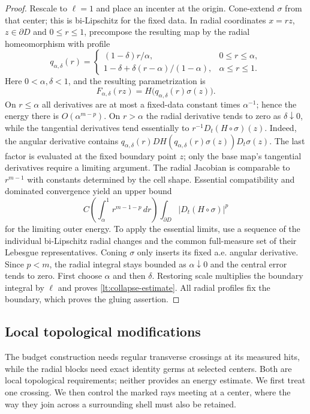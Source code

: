\begin{proof}
Rescale to $\ell=1$ and place an incenter at the origin. Cone-extend
$\sigma$ from that center; this is bi-Lipschitz for the fixed data.
In radial coordinates
$x=rz$, $z\in\partial D$ and $0\leq r\leq1$, precompose the
resulting map by the radial homeomorphism with profile
\[
 q_{\alpha,\delta}(r)=
 \begin{cases}
 (1-\delta)r/\alpha,&0\leq r\leq\alpha,\\
 1-\delta+\delta(r-\alpha)/(1-\alpha),&\alpha\leq r\leq1.
 \end{cases}
\]
Here $0<\alpha,\delta<1$, and the resulting parametrization is
\[
 F_{\alpha,\delta}(rz)
       =H\bigl(q_{\alpha,\delta}(r)\sigma(z)\bigr).
\]
On $r\leq\alpha$ all derivatives are
at most a fixed-data constant times $\alpha^{-1}$; hence the energy
there is $O(\alpha^{m-p})$.  On $r>\alpha$ the radial derivative
tends to zero as $\delta\downarrow0$, while the tangential derivatives
tend essentially to $r^{-1}D_t(H\circ\sigma)(z)$. Indeed, the
angular derivative contains
$q_{\alpha,\delta}(r)DH(q_{\alpha,\delta}(r)\sigma(z))D_t\sigma(z)$.
The last factor is evaluated at the fixed boundary point $z$;
only the base map's tangential derivatives require a limiting
argument. The radial
Jacobian is comparable to $r^{m-1}$ with constants determined by the
cell shape.  Essential compatibility and dominated convergence yield
an upper bound
\[
 C\left(\int_\alpha^1r^{m-1-p}\,dr\right)
                      \int_{\partial D}|D_t(H\circ\sigma)|^p
\]
for the limiting outer energy.  To apply the essential limits, use a
sequence of the individual bi-Lipschitz radial changes and the common
full-measure set of their Lebesgue representatives.  Coning $\sigma$
only inserts its fixed a.e. angular derivative.  Since $p<m$, the
radial integral stays bounded as $\alpha\downarrow0$ and the central
error tends to zero.  First choose $\alpha$ and then $\delta$.
Restoring scale multiplies the boundary integral by $\ell$ and proves
\eqref{lt:collapse-estimate}.  All radial profiles fix the boundary,
which proves the gluing assertion.
\end{proof}

\subsection{Local topological modifications}\label{lt:local-topology}

The budget construction needs regular transverse crossings at its
measured hits, while the radial blocks need exact identity germs at
selected centers. Both are local topological requirements; neither
provides an energy estimate. We first treat one crossing. We then
control the marked rays meeting at a center, where the way they join
across a surrounding shell must also be retained.

